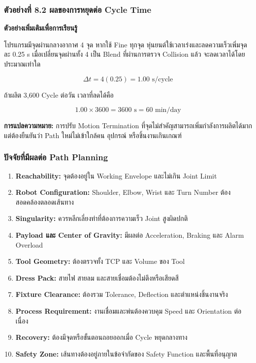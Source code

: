 \subsubsection{ตัวอย่างที่ 8.2 ผลของการหยุดต่อ Cycle Time}

\textbf{ตัวอย่างเพิ่มเติมเพื่อการเรียนรู้}

โปรแกรมมีจุดผ่านกลางอากาศ 4 จุด หากใช้ Fine ทุกจุด หุ่นยนต์ใช้เวลาเร่งและลดความเร็วเพิ่มจุดละ 0.25 s เมื่อเปลี่ยนจุดผ่านทั้ง 4 เป็น Blend ที่ผ่านการตรวจ Collision แล้ว จะลดเวลาได้โดยประมาณเท่าใด

\[
\Delta t = 4(0.25)=1.00\text{ s/cycle}
\]

ถ้าผลิต 3,600 Cycle ต่อวัน เวลาที่ลดได้คือ

\[
1.00\times 3600=3600\text{ s}=60\text{ min/day}
\]

\textbf{การแปลความหมาย:} การปรับ Motion Termination ที่จุดไม่สำคัญสามารถเพิ่มกำลังการผลิตได้มาก แต่ต้องยืนยันว่า Path ใหม่ไม่เข้าใกล้คน อุปกรณ์ หรือชิ้นงานเกินเกณฑ์

\subsubsection{ปัจจัยที่มีผลต่อ Path Planning}

\begin{enumerate}
    \item \textbf{Reachability:} จุดต้องอยู่ใน Working Envelope และไม่เกิน Joint Limit
    \item \textbf{Robot Configuration:} Shoulder, Elbow, Wrist และ Turn Number ต้องสอดคล้องตลอดเส้นทาง
    \item \textbf{Singularity:} ควรหลีกเลี่ยงท่าที่ต้องการความเร็ว Joint สูงผิดปกติ
    \item \textbf{Payload และ Center of Gravity:} มีผลต่อ Acceleration, Braking และ Alarm Overload
    \item \textbf{Tool Geometry:} ต้องตรวจทั้ง TCP และ Volume ของ Tool
    \item \textbf{Dress Pack:} สายไฟ สายลม และสายเชื่อมต้องไม่ตึงหรือเสียดสี
    \item \textbf{Fixture Clearance:} ต้องรวม Tolerance, Deflection และตำแหน่งชิ้นงานจริง
    \item \textbf{Process Requirement:} งานเชื่อมและพ่นต้องควบคุม Speed และ Orientation ต่อเนื่อง
    \item \textbf{Recovery:} ต้องมีจุดหรือขั้นตอนถอยออกเมื่อ Cycle หยุดกลางทาง
    \item \textbf{Safety Zone:} เส้นทางต้องอยู่ภายในข้อจำกัดของ Safety Function และพื้นที่อนุญาต
\end{enumerate}

